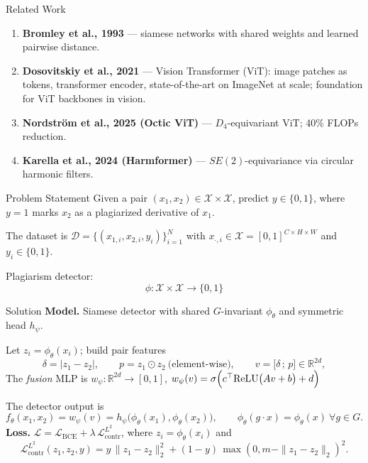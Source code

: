 \documentclass[aspectratio=169]{beamer}
\begin{document}
\begin{frame}{Related Work}
    \begin{enumerate}[1)]
        \item \textbf{Bromley et al., 1993} --- siamese networks with shared weights and learned pairwise distance.
        \item \textbf{Dosovitskiy et al., 2021} --- Vision Transformer (ViT): image patches as tokens, transformer encoder, state-of-the-art on ImageNet at scale; foundation for ViT backbones in vision.
        \item \textbf{Nordstr\"{o}m et al., 2025 (Octic ViT)} --- $D_4$-equivariant ViT; 40\% FLOPs reduction.
        \item \textbf{Karella et al., 2024 (Harmformer)} --- $SE(2)$-equivariance via circular harmonic filters.
    \end{enumerate}
\end{frame}

\begin{frame}{Problem Statement}
Given a pair $(x_1, x_2)\in\mathcal{X}\times\mathcal{X}$, predict $y \in \{0,1\}$, where $y=1$ marks $x_2$ as a plagiarized derivative of $x_1$.

\medskip

The dataset is $\mathcal{D} = \{(x_{1,i}, x_{2,i}, y_i)\}_{i=1}^{N}$ with $x_{\cdot,i} \in \mathcal{X} = [0,1]^{C\times H\times W}$ and $y_i \in \{0,1\}$.

\medskip

Plagiarism detector:
\[
     \phi\colon\mathcal{X}\times\mathcal{X}\to\{0,1\}
\]
\end{frame}
\begin{frame}{Solution}
    \textbf{Model.} Siamese detector with shared $G$-invariant $\phi_{\theta}$ and symmetric head $h_{\psi}$. 
    
    Let $z_i = \phi_{\theta}(x_i)$; build pair features
    \[
        \delta = |z_1 - z_2|,\qquad
        p = z_1 \odot z_2\ \text{(element-wise)},\qquad
        v = \bigl[ \delta\,;\, p \bigr] \in \mathbb{R}^{2d},
    \]
    The \emph{fusion} MLP is $w_{\psi} \colon \mathbb{R}^{2d} \to [0,1]$, $w_{\psi}(v) = \sigma\Bigl( c^\top \mathrm{ReLU}\bigl( A v + b \bigr) + d \Bigr)$

    The detector output is 
    \[
        f_{\theta}(x_1, x_2) = w_{\psi}(v) = h_{\psi}\bigl(\phi_{\theta}(x_1), \phi_{\theta}(x_2)\bigr), \qquad \phi_{\theta}(g \cdot x) = \phi_{\theta}(x)\ \forall g \in G.
    \]
    \textbf{Loss.} $\mathcal{L} = \mathcal{L}_{\mathrm{BCE}} + \lambda\,\mathcal{L}_{\mathrm{contr}}^{L^2}$, where $z_i = \phi_{\theta}(x_i)$ and
    \[
        \mathcal{L}_{\mathrm{contr}}^{L^2}(z_1, z_2, y) = y\,\|z_1{-}z_2\|_2^2 + (1{-}y)\,\max(0, m - \|z_1{-}z_2\|_2)^2.
    \]

\end{frame}
\end{document}
